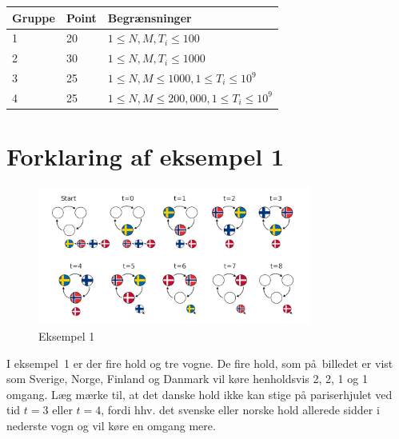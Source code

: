\noindent
\begin{tabular}{| l | l | l |}
\hline
Gruppe & Point & Begrænsninger \\ \hline
1     & 20    & $1 \le N, M, T_i \le 100$ \\ \hline
2     & 30    & $1 \le N, M, T_i \le 1000$ \\ \hline
3     & 25    & $1 \le N, M \le 1000, 1 \le T_i \le 10^9$ \\ \hline
4     & 25    & $1 \le N, M \le 200,000, 1 \le T_i \le 10^9$ \\ \hline
\end{tabular}

\section*{Forklaring af eksempel 1}

\begin{figure}[h]
	\centering
\includegraphics[width=0.8\textwidth]{sample1}
\caption{Eksempel 1}
\end{figure}

I eksempel~1 er der fire hold og tre vogne.
De fire hold, som på billedet er vist som Sverige, Norge, Finland og Danmark vil køre henholdsvis 2, 2, 1 og 1 omgang.
Læg mærke til, at det danske hold ikke kan stige på pariserhjulet ved tid $t=3$ eller $t=4$, fordi hhv. det svenske eller norske hold allerede sidder i nederste vogn og vil køre en omgang mere.

